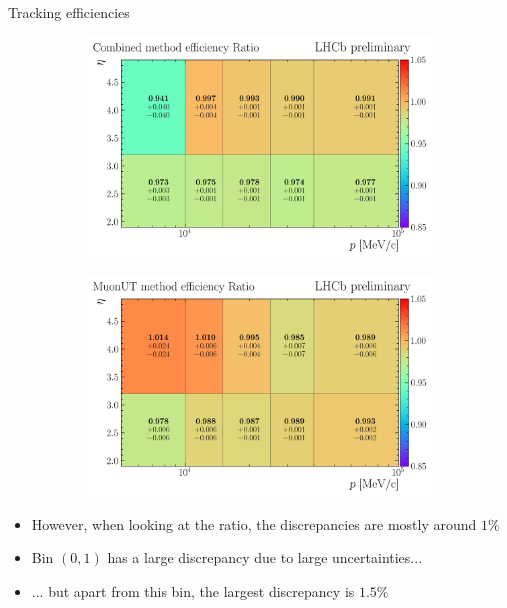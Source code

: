 \documentclass[xcolor={dvipsnames}]{beamer}
\begin{document}
\begin{frame}{Tracking efficiencies}
  \vspace{0.0cm}
  \begin{figure}[htb]
    \centering
    \begin{subfigure}{0.5\textwidth}
      \centering
      \includegraphics[width=1.0\textwidth]{Plots/trackEff_Ratio_Sim10d_2024_Block1_Combined_P-ETA.png}
    \end{subfigure}%
    \begin{subfigure}{0.5\textwidth}
      \centering
      \includegraphics[width=1.0\textwidth]{Plots/trackEff_Ratio_Sim10d_2024_Block1_MuonUT_P-ETA.png}
    \end{subfigure}
  \end{figure}
  \begin{itemize}
    \item{However, when looking at the ratio, the discrepancies are mostly around $1\%$}
    \item{Bin $(0, 1)$ has a large discrepancy due to large uncertainties...}
    \item{... but apart from this bin, the largest discrepancy is $1.5\%$}
  \end{itemize}
\end{frame}
\end{document}
